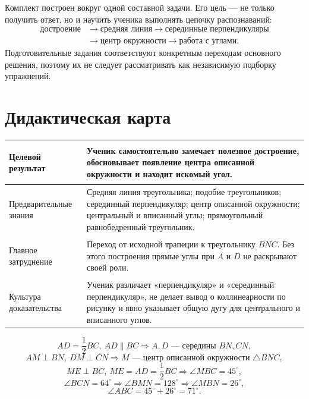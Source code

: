 

\begin{teacherbox}
Комплект построен вокруг одной составной задачи. Его цель — не только получить
ответ, но и научить ученика выполнять цепочку распознаваний:
\[
\begin{aligned}
\text{достроение}
&\longrightarrow
\text{средняя линия}
\longrightarrow
\text{серединные перпендикуляры}\\
&\longrightarrow
\text{центр окружности}
\longrightarrow
\text{работа с углами}.
\end{aligned}
\]
Подготовительные задания соответствуют конкретным переходам основного решения,
поэтому их не следует рассматривать как независимую подборку упражнений.
\end{teacherbox}

\section{Дидактическая карта}

\begin{tabularx}{\linewidth}{@{}>{\bfseries\sffamily\raggedright\arraybackslash}p{42mm}>{\raggedright\arraybackslash}X@{}}
\toprule
Целевой результат & Ученик самостоятельно замечает полезное достроение,
обосновывает появление центра описанной окружности и находит искомый угол.\\
\midrule
Предварительные знания & Средняя линия треугольника; подобие треугольников;
серединный перпендикуляр; центр описанной окружности; центральный и вписанный
углы; прямоугольный равнобедренный треугольник.\\
\midrule
Главное затруднение & Переход от исходной трапеции к треугольнику \(BNC\).
Без этого построения прямые углы при \(A\) и \(D\) не раскрывают своей роли.\\
\midrule
Культура доказательства & Ученик различает «перпендикуляр» и
«серединный перпендикуляр», не делает вывод о коллинеарности по рисунку и явно
указывает общую дугу для центрального и вписанного углов.\\
\bottomrule
\end{tabularx}

\newpage

\begin{routebox}
\[
AD=\frac12BC,
\ AD\parallel BC
\Longrightarrow
A,D\text{ — середины }BN,CN,
\]
\[
AM\perp BN,
\ DM\perp CN
\Longrightarrow
M\text{ — центр описанной окружности }\triangle BNC,
\]
\[
ME\perp BC,
\ ME=AD=\frac12BC
\Longrightarrow
\angle MBC=45^\circ,
\]
\[
\angle BCN=64^\circ
\Longrightarrow
\angle BMN=128^\circ
\Longrightarrow
\angle MBN=26^\circ,
\]
\[
\angle ABC=45^\circ+26^\circ=71^\circ.
\]
\end{routebox}

